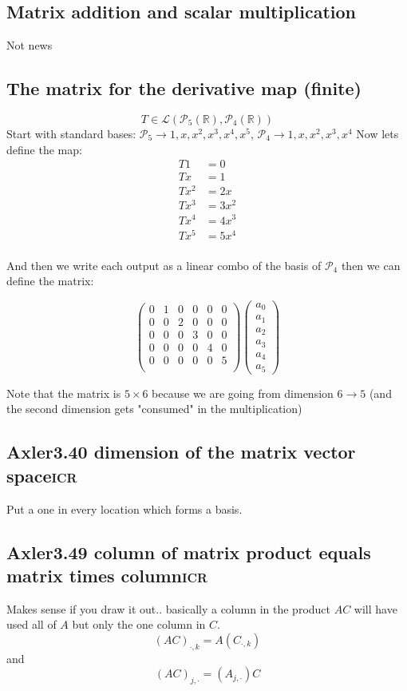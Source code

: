 \documentclass[letterpaper]{article}
\begin{document}
\subsection{Matrix addition and scalar multiplication}
\label{sec:orgdc3021d}
Not news

\subsection{The matrix for the derivative map (finite)}
\label{sec:orge78ba80}
$$T \in \mathcal L\left(\mathcal P_5\left(\mathbb R\right), \mathcal P_4\left(\mathbb R\right)\right)$$
Start with standard bases: \(\mathcal P_5 \rightarrow 1, x, x^2, x^3, x^4, x^5\), \(\mathcal P_4 \rightarrow 1, x, x^2, x^3, x^4\)
Now lets define the map:
$$\begin{align*}
   T 1 &= 0\\
   T x &= 1\\
   T x^2 &= 2x\\
   T x^3 &= 3x^2\\
   T x^4 &= 4x^3\\
   T x^5 &= 5x^4\\
   \end{align*}$$

And then we write each output as a linear combo of the basis of \(\mathcal P_4\) then we can define the matrix:

$$ \begin{pmatrix}
   0&1&0&0&0&0\\
   0&0&2&0&0&0\\
   0&0&0&3&0&0\\
   0&0&0&0&4&0\\
   0&0&0&0&0&5\\
   \end{pmatrix} \begin{pmatrix}
   a_0\\a_1\\a_2\\a_3\\a_4\\a_5
   \end{pmatrix} $$

Note that the matrix is \(5\times 6\) because we are going from dimension \(6 \to 5\) (and the second dimension gets "consumed" in the multiplication)

\subsection{Axler3.40 dimension of the matrix vector space\hfill{}\textsc{icr}}
\label{sec:org25f9b20}
Put a one in every location which forms a basis.

\subsection{Axler3.49 column of matrix product equals matrix times column\hfill{}\textsc{icr}}
\label{sec:org33c2f08}
Makes sense if you draw it out.. basically a column in the product \(AC\) will have used all of \(A\) but only the one column in \(C\).
$$(AC)_{\cdot, k} = A(C_{\cdot, k})$$ and $$(AC)_{j, \cdot} = (A_{j, \cdot})C$$
\end{document}

